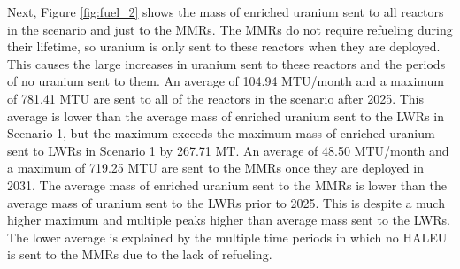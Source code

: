Next, Figure \ref{fig:fuel_2} shows the mass of enriched uranium sent to all 
reactors in the scenario and just to the \glspl{MMR}. The \glspl{MMR} 
do not require refueling during their lifetime, so uranium is only 
sent to these reactors when they are deployed. This causes the 
large increases in uranium sent to these reactors and the periods of 
no uranium sent to them. An average of 104.94 MTU/month and a maximum 
of 781.41 MTU are sent to all of the reactors in the scenario after 2025. 
This average is lower than the average mass of enriched uranium 
sent to the \glspl{LWR} in Scenario 1, but the maximum exceeds the maximum 
mass of enriched uranium sent to \glspl{LWR} in Scenario 1 by 267.71 MT.
An average of 48.50 MTU/month and a maximum of 719.25 
MTU are sent to the \glspl{MMR} once they are deployed in 2031. The average 
mass of enriched uranium sent to the 
\glspl{MMR} is lower than the average mass of uranium sent to the \glspl{LWR}
prior to 2025. This is despite a much higher maximum and multiple peaks higher
than
average mass sent to the \glspl{LWR}. The lower average is explained by the 
multiple time periods in 
which no \gls{HALEU} is sent to the \glspl{MMR} due to the lack of refueling.  

